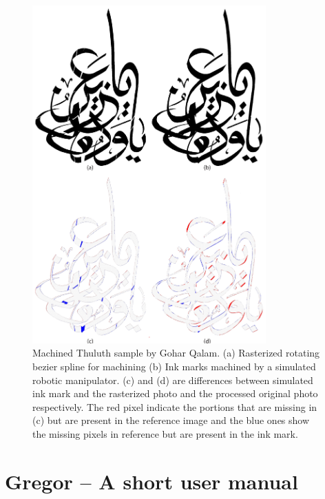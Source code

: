 {\begin{figure}[H]
  \centering
  \includegraphics[width=0.8\textwidth]{../Images/Thuluth_Machined.pdf}
  \caption
  {
      Machined Thuluth sample by Gohar Qalam. (a) Rasterized rotating bezier spline for machining (b) Ink marks machined by a simulated robotic manipulator. (c) and (d) are differences between simulated ink mark and the rasterized photo and the processed original photo respectively. The red pixel indicate the portions that are missing in (c) but are present in the reference image and the blue ones show the missing pixels in reference but are present in the ink mark.
  }
\end{figure}
}
\section{Gregor -- A short user manual}\label{Appendix:Gregor}
